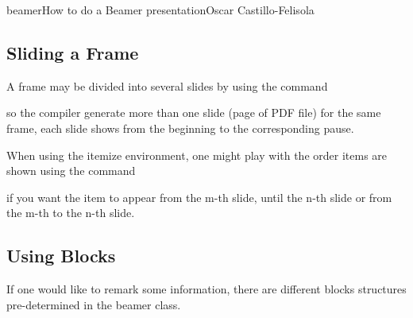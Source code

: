 \begin{article}[2]{beamer}{How to do a Beamer presentation}{Oscar Castillo-Felisola}






  \subsection{Sliding a Frame}

  A frame may be divided into several slides by using the command


  so the compiler generate more than one slide (page of PDF file) for the same frame, each slide shows from the beginning to the corresponding pause.

  When using the itemize environment, one might play with the order items are shown using the command




  if you want the item to appear from the m-th slide, until the n-th slide or from the m-th to the n-th slide.

  \subsection{Using Blocks}

  If one would like to remark some information, there are different blocks structures pre-determined in the beamer class.








\end{article}
